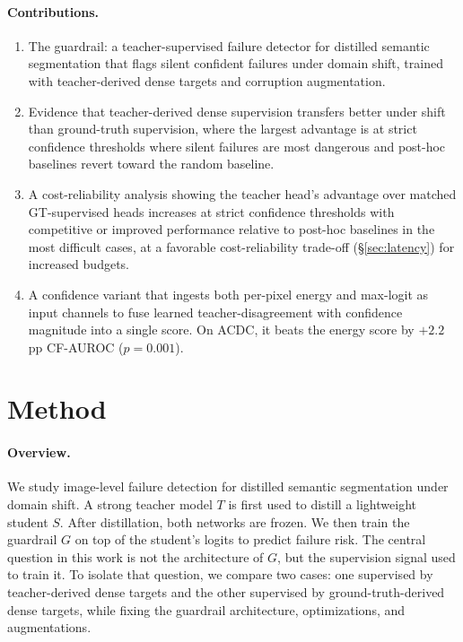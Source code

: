 \documentclass{article}
\begin{document}
\paragraph{Contributions.}
\begin{enumerate}
\item The guardrail: a teacher-supervised failure detector for distilled semantic segmentation that flags silent confident failures under domain shift, trained with teacher-derived dense targets and corruption augmentation.
\item Evidence that teacher-derived dense supervision transfers better under shift than ground-truth supervision, where the largest advantage is at strict confidence thresholds where silent failures are most dangerous and post-hoc baselines revert toward the random baseline.
\item A cost-reliability analysis showing the teacher head's advantage over matched GT-supervised heads increases at strict confidence thresholds with competitive or improved performance relative to post-hoc baselines in the most difficult cases, at a favorable cost-reliability trade-off (\S\ref{sec:latency}) for increased budgets.
\item A confidence variant that ingests both per-pixel energy and max-logit as input channels to fuse learned teacher-disagreement with confidence magnitude into a single score. On ACDC, it beats the energy score by $+2.2$\,pp CF-AUROC ($p{=}0.001$).
\end{enumerate}


\section{Method}


\paragraph{Overview.}
We study image-level failure detection for distilled semantic segmentation under domain shift. A strong teacher model $T$ is first used to distill a lightweight student $S$. After distillation, both networks are frozen. We then train the guardrail $G$ on top of the student's logits to predict failure risk. The central question in this work is not the architecture of $G$, but the supervision signal used to train it. To isolate that question, we compare two cases: one supervised by teacher-derived dense targets and the other supervised by ground-truth-derived dense targets, while fixing the guardrail architecture, optimizations, and augmentations.
\end{document}
